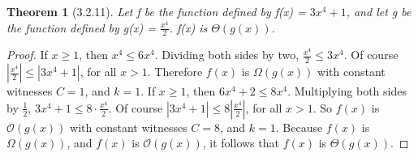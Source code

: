 \documentclass[a4paper, 12pt]{article}
\theoremstyle{plain}
\newtheorem*{theorem*}{Theorem}
\begin{document}
	
	\begin{theorem*}[3.2.11]
		Let f be the function defined by f(x) = $3x^{4} + 1$, and let g be the function defined by g(x) = $\frac{x^{4}}{2}$. f(x) is $\Theta (g(x))$.
	\end{theorem*}
	
	\begin{proof}
		If $x \ge 1$, then $x^{4} \le 6x^{4}$. Dividing both sides by two, $\frac{x^{4}}{2} \le 3x^{4}$. Of course $|\frac{x^{4}}{2}| \le |3x^{4} + 1|$, for all $x > 1$. Therefore $f(x)$ is $\Omega (g(x))$ with constant witnesses $C = 1$, and $k = 1$.
		\newline \indent If $x \ge 1$, then $6x^{4} + 2 \le 8x^{4}$. Multiplying both sides by $\frac{1}{2}$, \newline $3x^{4} + 1 \le 8 \cdot \frac{x^{4}}{2}$. Of course $|3x^{4} + 1| \le 8 |\frac{x^{4}}{2}|$, for all $x > 1$. So $f(x)$ is $\mathcal{O}(g(x))$ with constant witnesses $C = 8$, and $k = 1$.
		\newline \indent Because $f(x)$ is $\Omega (g(x))$, and $f(x)$ is $\mathcal{O}(g(x))$, it follows that $f(x)$ is $\Theta (g(x))$.
	\end{proof}
\end{document}
